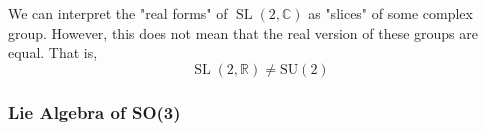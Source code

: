 \documentclass{article}
\DeclareMathOperator{\SL}{SL}
\begin{document}
      \begin{center}
      \end{center}
      We can interpret the "real forms" of $\SL(2, \mathbb{C})$ as "slices" of some complex group. However, this does not mean that the real version of these groups are equal. That is, 
      \begin{equation}
        \SL(2, \mathbb{R}) \neq \text{SU}(2)
      \end{equation}

    \subsubsection{Lie Algebra of SO(3)}
\end{document}
